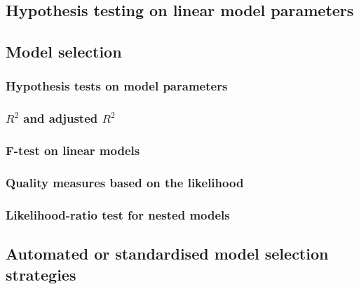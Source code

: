 \subsection{Hypothesis testing on linear model parameters}

\subsection{Model selection}

\subsubsection{Hypothesis tests on model parameters}

\subsubsection{$R^2$ and adjusted $R^2$}

\subsubsection{F-test on linear models}

\subsubsection{Quality measures based on the likelihood}

\subsubsection{Likelihood-ratio test for nested models}

\subsection{Automated or standardised model selection strategies}